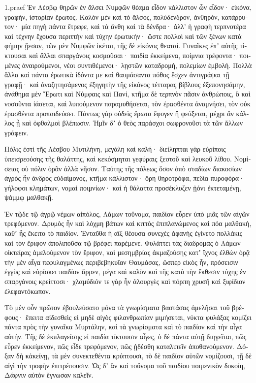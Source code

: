 \documentclass{book}
\begin{document}
\begin{pairs}
\begin{Leftside} 
\begin{greek}
\beginnumbering
\pstart
1.praef  Ἐν Λέσβῳ θηρῶν ἐν ἄλσει Νυμφῶν θέαμα εἶδον κάλλιστον ὧν εἶδον· εἰκόνα, γραφήν, ἱστορίαν ἔρωτος. Καλὸν μὲν καὶ τὸ ἄλσος, πολύδενδρον, ἀνθηρόν, κατάρρυτον· μία πηγὴ πάντα ἔτρεφε, καὶ τὰ ἄνθη καὶ τὰ δένδρα· ἀλλ’ ἡ γραφὴ τερπνοτέρα καὶ τέχνην ἔχουσα περιττὴν καὶ τύχην ἐρωτικήν· ὥστε πολλοὶ καὶ τῶν ξένων κατὰ φήμην ᾔεσαν, τῶν μὲν Νυμφῶν ἱκέται, τῆς δὲ εἰκόνος θεαταί.  Γυναῖκες ἐπʼ αὐτῆς τίκτουσαι καὶ ἄλλαι σπαργάνοις κοσμοῦσαι· παιδία ἐκκείμενα, ποίμνια τρέφοντα· ποιμένες ἀναιρούμενοι, νέοι συντιθέμενοι· λῃστῶν καταδρομή, πολεμίων ἐμβολή. Πολλὰ ἄλλα καὶ πάντα ἐρωτικὰ ἰδόντα με καὶ θαυμάσαντα πόθος ἔσχεν ἀντιγράψαι τῇ γραφῇ·  καὶ ἀναζητησάμενος ἐξηγητὴν τῆς εἰκόνος τέτταρας βίβλους ἐξεπονησάμην, ἀνάθημα μὲν Ἔρωτι καὶ Νύμφαις καὶ Πανί, κτῆμα δὲ τερπνὸν πᾶσιν ἀνθρώποις, ὃ καὶ νοσοῦντα ἰάσεται, καὶ λυπούμενον παραμυθήσεται, τὸν ἐρασθέντα ἀναμνήσει,  τὸν οὐκ ἐρασθέντα προπαιδεύσει. Πάντως γὰρ οὐδεὶς ἔρωτα ἔφυγεν ἢ φεύξεται, μέχρι ἂν κάλλος ᾖ καὶ ὀφθαλμοὶ βλέπωσιν. Ἡμῖν δʼ ὁ θεὸς παράσχοι σωφρονοῦσι τὰ τῶν ἄλλων γράφειν.
\pend


  Πόλις ἐστὶ τῆς Λέσβου Μυτιλήνη, μεγάλη καὶ καλή· διείληπται γὰρ εὐρίποις ὑπεισρεούσης τῆς θαλάττης, καὶ κεκόσμηται γεφύραις ξεστοῦ καὶ λευκοῦ λίθου. Νομίσειας οὐ πόλιν ὁρᾶν ἀλλὰ νῆσον.  Ταύτης τῆς πόλεως ὅσον ἀπὸ σταδίων διακοσίων ἀγρὸς ἦν ἀνδρὸς εὐδαίμονος, κτῆμα κάλλιστον· ὄρη θηροτρόφα, πεδία πυροφόρα· γήλοφοι κλημάτων, νομαὶ ποιμνίων· καὶ ἡ θάλαττα προσέκλυζεν ᾐόνι ἐκτεταμένῃ, ψάμμῳ μαλθακῇ.
\pend


  Ἐν τῷδε τῷ ἀγρῷ νέμων αἰπόλος, Λάμων τοὔνομα, παιδίον εὗρεν ὑπὸ μιᾶς τῶν αἰγῶν τρεφόμενον. Δρυμὸς ἦν καὶ λόχμη βάτων καὶ κιττὸς ἐπιπλανώμενος καὶ πόα μαλθακή, καθʼ ἧς ἔκειτο τὸ παιδίον. Ἐνταῦθα ἡ αἲξ θέουσα συνεχὲς ἀφανὴς ἐγίνετο πολλάκις καὶ τὸν ἔριφον ἀπολιποῦσα τῷ βρέφει παρέμενε.  Φυλάττει τὰς διαδρομὰς ὁ Λάμων οἰκτείρας ἀμελούμενον τὸν ἔριφον, καὶ μεσημβρίας ἀκμαζούσης κατʼ ἴχνος ἐλθὼν ὁρᾷ τὴν μὲν αἶγα πεφυλαγμένως περιβεβηκυῖαν  Θαυμάσας, ὥσπερ εἰκὸς ἦν, πρόσεισιν ἐγγὺς καὶ εὑρίσκει παιδίον ἄρρεν, μέγα καὶ καλὸν καὶ τῆς κατὰ τὴν ἔκθεσιν τύχης ἐν σπαργάνοις κρείττοσι· χλαμύδιόν τε γὰρ ἦν ἁλουργὲς καὶ πόρπη χρυσῆ καὶ ξιφίδιον ἐλεφαντόκωπον.
\pend


  Τὸ μὲν οὖν πρῶτον ἐβουλεύσατο μόνα τὰ γνωρίσματα βαστάσας ἀμελῆσαι τοῦ βρέφους· ἔπειτα αἰδεσθεὶς εἰ μηδὲ αἰγὸς φιλανθρωπίαν μιμήσεται, νύκτα φυλάξας κομίζει πάντα πρὸς τὴν γυναῖκα Μυρτάλην, καὶ τὰ γνωρίσματα καὶ τὸ παιδίον καὶ τὴν αἶγα αὐτήν.  Τῆς δὲ ἐκπλαγείσης εἰ παιδία τίκτουσιν αἶγες, ὁ δὲ πάντα αὐτῇ διηγεῖται, πῶς εὗρεν ἐκκείμενον, πῶς εἶδε τρεφόμενον, πῶς ᾐδέσθη καταλιπεῖν ἀποθανούμενον. Δόξαν δὴ κἀκείνῃ, τὰ μὲν συνεκτεθέντα κρύπτουσι, τὸ δὲ παιδίον αὑτῶν νομίζουσι, τῇ δὲ αἰγὶ τὴν τροφὴν ἐπιτρέπουσιν. Ὡς δʼ ἂν καὶ τοὔνομα τοῦ παιδίου ποιμενικὸν δοκοίη, Δάφνιν αὐτὸν ἔγνωσαν καλεῖν.
\pend



\end{greek}
\end{Leftside}
\end{pairs}
\end{document}
